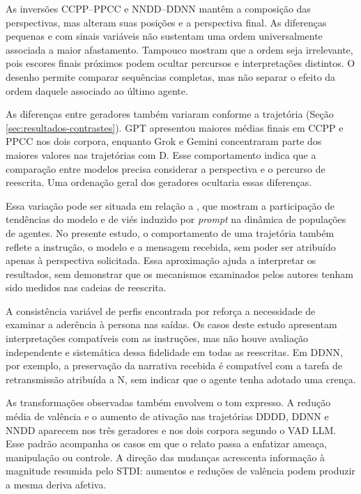 As inversões CCPP--PPCC e NNDD--DDNN mantêm a composição das perspectivas, mas alteram suas posições e a perspectiva final. As diferenças pequenas e com sinais variáveis não sustentam uma ordem universalmente associada a maior afastamento. Tampouco mostram que a ordem seja irrelevante, pois escores finais próximos podem ocultar percursos e interpretações distintos. O desenho permite comparar sequências completas, mas não separar o efeito da ordem daquele associado ao último agente.

As diferenças entre geradores também variaram conforme a trajetória (Seção \ref{sec:resultados-contrastes}). GPT apresentou maiores médias finais em CCPP e PPCC nos dois corpora, enquanto Grok e Gemini concentraram parte dos maiores valores nas trajetórias com D. Esse comportamento indica que a comparação entre modelos precisa considerar a perspectiva e o percurso de reescrita. Uma ordenação geral dos geradores ocultaria essas diferenças.

Essa variação pode ser situada em relação a , que mostram a participação de tendências do modelo e de viés induzido por \textit{prompt} na dinâmica de populações de agentes. No presente estudo, o comportamento de uma trajetória também reflete a instrução, o modelo e a mensagem recebida, sem poder ser atribuído apenas à perspectiva solicitada. Essa aproximação ajuda a interpretar os resultados, sem demonstrar que os mecanismos examinados pelos autores tenham sido medidos nas cadeias de reescrita.

A consistência variável de perfis encontrada por  reforça a necessidade de examinar a aderência à persona nas saídas. Os casos deste estudo apresentam interpretações compatíveis com as instruções, mas não houve avaliação independente e sistemática dessa fidelidade em todas as reescritas. Em DDNN, por exemplo, a preservação da narrativa recebida é compatível com a tarefa de retransmissão atribuída a N, sem indicar que o agente tenha adotado uma crença.

As transformações observadas também envolvem o tom expresso. A redução média de valência e o aumento de ativação nas trajetórias DDDD, DDNN e NNDD aparecem nos três geradores e nos dois corpora segundo o VAD LLM. Esse padrão acompanha os casos em que o relato passa a enfatizar ameaça, manipulação ou controle. A direção das mudanças acrescenta informação à magnitude resumida pelo STDI: aumentos e reduções de valência podem produzir a mesma deriva afetiva.

